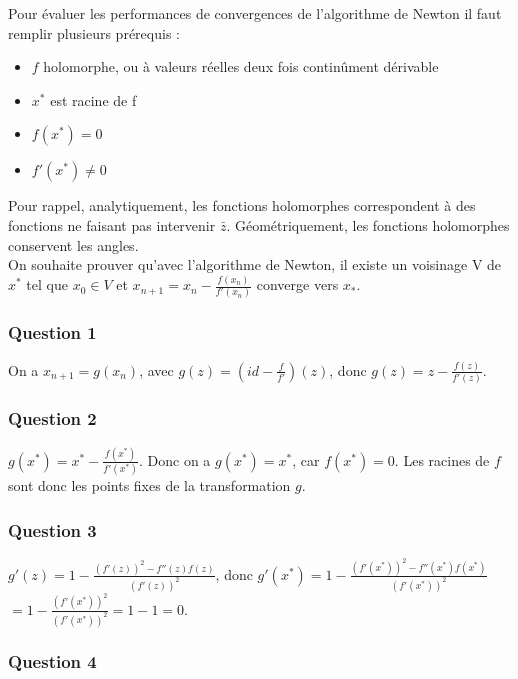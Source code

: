 \documentclass{article}
\begin{document}
	Pour évaluer les performances de convergences de l'algorithme de Newton il faut remplir plusieurs prérequis :
	\begin{itemize}
		\item $f$ holomorphe, ou à valeurs réelles deux fois continûment dérivable
		\item $x^{*}$ est racine de f
		\item $f(x^{*})=0$
		\item $f'(x^{*}) \neq 0$
	\end{itemize}
	
	Pour rappel, analytiquement, les fonctions holomorphes correspondent à des fonctions ne faisant pas intervenir $\bar{z}$. Géométriquement, les fonctions holomorphes conservent les angles.\\
	
	On souhaite prouver qu'avec l'algorithme de Newton, il existe un voisinage V de $x^{*}$ tel que $x_{0} \in V$ et $x_{n+1}=x_{n}-\frac{f(x_{n})}{f'(x_{n})}$ converge vers $x_{*}$.\\
	
	\subsubsection{Question 1}
	
	On a $x_{n+1}=g(x_{n})$,
	avec $g(z)=(id-\frac{f}{f'})(z)$,
	donc $g(z)=z-\frac{f(z)}{f'(z)}$.
	
	\subsubsection{Question 2}
	
	$g(x^{*})=x^{*}-\frac{f(x^{*})}{f'(x^{*})}$.
	Donc on a $g(x^{*})=x^{*}$, car $f(x^{*})=0$.
	Les racines de $f$ sont donc les points fixes de la transformation $g$.

	\subsubsection{Question 3}
	
	$g'(z)=1-\frac{(f'(z))^{2}-f''(z)f(z)}{(f'(z))^{2}}$, donc
	$g'(x^{*})=1-\frac{(f'(x^{*}))^{2}-f''(x^{*})f(x^{*})}{(f'(x^{*}))^{2}}$
	$=1-\frac{(f'(x^{*}))^{2}}{(f'(x^{*}))^{2}}=1-1=0$.
	
	\subsubsection{Question 4}
	
\end{document}
